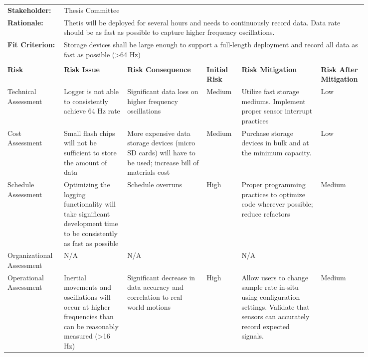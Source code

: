 \begin{landscape}
{\begin{longtable}{| p{0.12\linewidth} | p{0.16\linewidth} |  p{0.20\linewidth} | p{0.08\linewidth} | p{0.20\linewidth} | p{0.08\linewidth} |}
	\hline
	\rowcolor[gray]{0.8}
	\multicolumn{6}{|c|}{ } \\
	\hline
	\textbf{Stakeholder:} & \multicolumn{5}{|l|}{Thesis Committee} \\
	\hline
	\textbf{Rationale:} & \multicolumn{5}{|p{0.8\linewidth}|}{Thetis will be deployed for several hours and needs to continuously record data. Data rate should be as fast as possible to capture higher frequency oscillations.} \\
	\hline
	\textbf{Fit Criterion:} & \multicolumn{5}{|p{0.8\linewidth}|}{Storage devices shall be large enough to support a full-length deployment and record all data as fast as possible (\textgreater 64 Hz)} \\
	\hline
	\rowcolor[gray]{0.8}
	\multicolumn{6}{|c|}{ } \\
	\hline
	\textbf{Risk} & \textbf{Risk Issue} & \textbf{Risk Consequence} & \textbf{Initial Risk} & \textbf{Risk Mitigation} & \textbf{Risk \newline After \newline Mitigation} \\
	\hline
	Technical \newline Assessment & Logger is not able to consistently achieve 64 Hz rate & Significant data loss on higher frequency oscillations & \cellcolor{yellow} Medium & Utilize fast storage mediums. \newline Implement proper sensor interrupt practices & \cellcolor{green} Low \\
	\hline
	Cost \newline Assessment & Small flash chips will not be sufficient to store the amount of data & More expensive data storage devices (micro SD cards) will have to be used; increase bill of materials cost & \cellcolor{yellow} Medium & Purchase storage devices in bulk and at the minimum capacity. & \cellcolor{green} Low \\
	\hline
	Schedule \newline Assessment & Optimizing the logging functionality will take significant development time to be consistently as fast as possible & Schedule overruns & \cellcolor{red} High & Proper programming practices to optimize code wherever possible; reduce refactors & \cellcolor{yellow} Medium \\
	\hline
	Organizational \newline Assessment & N/A & N/A & \cellcolor[gray]{0.8}  & N/A & \cellcolor[gray]{0.8}  \\
	\hline
	Operational \newline Assessment & Inertial movements and oscillations will occur at higher frequencies than can be reasonably measured (\textgreater 16 Hz) & Significant decrease in data accuracy and correlation to real-world motions & \cellcolor{red} High & Allow users to change sample rate in-situ using configuration settings. \newline Validate that sensors can accurately record expected signals. & \cellcolor{yellow} Medium
	\label{tab:sr09_feasibility}
\end{longtable}
}
\newpage


\end{landscape}
